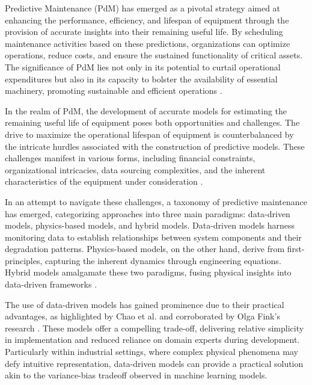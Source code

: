 \documentclass{IEEEtran}
\begin{document}

        Predictive Maintenance (PdM) has emerged as a pivotal strategy aimed at enhancing the performance, efficiency, and lifespan of equipment through the provision of accurate insights into their remaining useful life. By scheduling maintenance activities based on these predictions, organizations can optimize operations, reduce costs, and ensure the sustained functionality of critical assets. The significance of PdM lies not only in its potential to curtail operational expenditures but also in its capacity to bolster the availability of essential machinery, promoting sustainable and efficient operations \cite{Achouch2022}.

        In the realm of PdM, the development of accurate models for estimating the remaining useful life of equipment poses both opportunities and challenges. The drive to maximize the operational lifespan of equipment is counterbalanced by the intricate hurdles associated with the construction of predictive models. These challenges manifest in various forms, including financial constraints, organizational intricacies, data sourcing complexities, and the inherent characteristics of the equipment under consideration \cite{Achouch2022} \cite{Fink2020}.

        In an attempt to navigate these challenges, a taxonomy of predictive maintenance has emerged, categorizing approaches into three main paradigms: data-driven models, physics-based models, and hybrid models. Data-driven models harness monitoring data to establish relationships between system components and their degradation patterns. Physics-based models, on the other hand, derive from first-principles, capturing the inherent dynamics through engineering equations. Hybrid models amalgamate these two paradigms, fusing physical insights into data-driven frameworks \cite{chao-thesis}.

        The use of data-driven models has gained prominence due to their practical advantages, as highlighted by Chao et al. and corroborated by Olga Fink's research \cite{chao-thesis} \cite{Fink2020}. These models offer a compelling trade-off, delivering relative simplicity in implementation and reduced reliance on domain experts during development. Particularly within industrial settings, where complex physical phenomena may defy intuitive representation, data-driven models can provide a practical solution akin to the variance-bias tradeoff observed in machine learning models.
\end{document}
